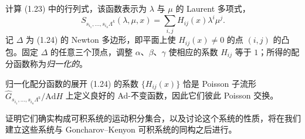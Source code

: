 计算 (1.23) 中的行列式，该函数表示为 $\lambda$ 与 $\mu$ 的 Laurent 多项式，
\begin{equation}\label{eq:1.24}
S_{s_{i_1},\dots,s_{i_n}\Lambda^k}(\lambda,\mu,x)=\sum_{i,j}H_{ij}(x)\lambda^i\mu^j.
\tag{1.24}
\end{equation}
记 $\Delta$ 为 (1.24) 的 Newton 多边形，即平面上使 $H_{ij}(x)\neq0$ 的点 $(i,j)$ 的凸包。固定 $\Delta$ 的任意三个顶点，调整 $\alpha$、$\beta$、$\gamma$ 使相应的系数 $H_{ij}$ 等于 $1$；所得的配分函数称为\emph{归一化的}。

\begin{theorem}\label{thm:1.4.1}
归一化配分函数的展开 (1.24) 的系数 $\{H_{ij}(x)\}$ 恰是 Poisson 子流形 $\hat G_{s_{i_1},\dots,\allowbreak s_{i_n}\Lambda^k}/\mathrm{Ad}H$ 上定义良好的 Ad-不变函数，因此它们彼此 Poisson 交换。
\end{theorem}

证明它们确实构成可积系统的运动积分集合，以及讨论这个系统的性质，将在我们建立这些系统与 Goncharov–Kenyon 可积系统的同构之后进行。
